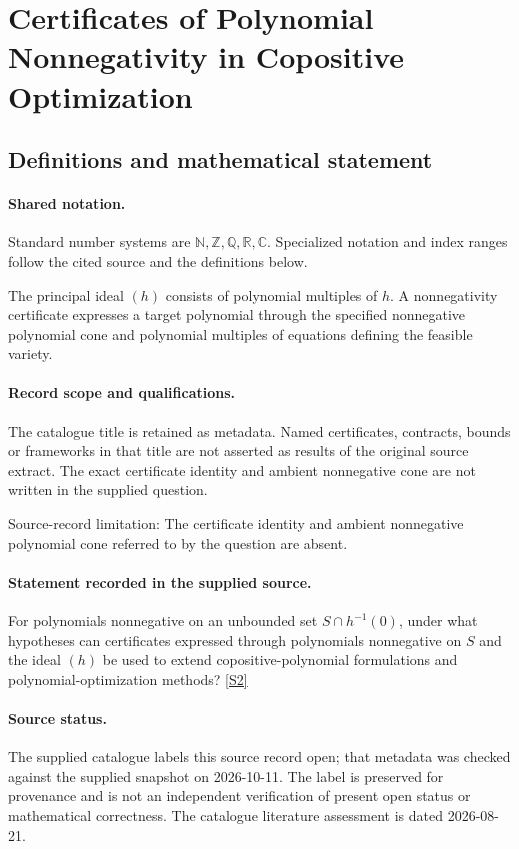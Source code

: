 \documentclass[11pt]{article}
\newcommand{\sref}[2]{\hyperlink{source:#1:#2}{[S#2]}}
\begin{document}
\section{Certificates of Polynomial Nonnegativity in Copositive Optimization}\label{statement}

\subsection{Definitions and mathematical statement}

\paragraph{Shared notation.}Standard number systems are $\mathbb N,\mathbb Z,\mathbb Q,\mathbb R,\mathbb C$. Specialized notation and index ranges follow the cited source and the definitions below.


The principal ideal $(h)$ consists of polynomial multiples of $h$. A nonnegativity certificate expresses a target polynomial through the specified nonnegative polynomial cone and polynomial multiples of equations defining the feasible variety.
\paragraph{Record scope and qualifications.}
The catalogue title is retained as metadata. Named certificates, contracts, bounds or frameworks in that title are not asserted as results of the original source extract.
The exact certificate identity and ambient nonnegative cone are not written in the supplied question.

Source-record limitation: The certificate identity and ambient nonnegative polynomial cone referred to by the question are absent.
\paragraph{Statement recorded in the supplied source.}
For polynomials nonnegative on an unbounded set $S\cap h^{-1}(0)$, under what hypotheses can certificates expressed through polynomials nonnegative on $S$ and the ideal $(h)$ be used to extend copositive-polynomial formulations and polynomial-optimization methods? \sref{statement}{2}
\paragraph{Source status.}
The supplied catalogue labels this source record open; that metadata was checked against the supplied snapshot on 2026-10-11. The label is preserved for provenance and is not an independent verification of present open status or mathematical correctness. The catalogue literature assessment is dated 2026-08-21.
\end{document}
